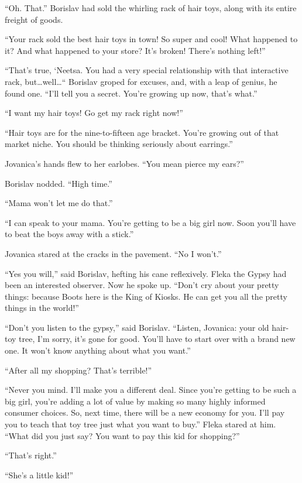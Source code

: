 \documentclass[20 pt,twoside,extrafontsizes,final]{memoir}
\begin{document}
``Oh. That.'' Borislav had sold the whirling rack of hair toys, along with its entire freight of goods. 

``Your rack sold the best hair toys in town! So super and cool! What happened to it? And what happened to your store? It's broken! There's nothing left!''

``That's true, `Neetsa. You had a very special relationship with that interactive rack, but\dots well\dots`` Borislav groped for excuses, and, with a leap of genius, he found one. ``I'll tell you a secret. You're growing up now, that's what.''

``I want my hair toys! Go get my rack right now!''

``Hair toys are for the nine-to-fifteen age bracket. You're growing out of that market niche. You should be thinking seriously about earrings.''

Jovanica's hands flew to her earlobes. ``You mean pierce my ears?''

Borislav nodded. ``High time.''

``Mama won't let me do that.''

``I can speak to your mama. You're getting to be a big girl now. Soon you'll have to beat the boys away with a stick.''

Jovanica stared at the cracks in the pavement. ``No I won't.''

``Yes you will,'' said Borislav, hefting his cane reflexively. Fleka the Gypsy had been an interested observer. Now he spoke up. ``Don't cry about your pretty things: because Boots here is the King of Kiosks. He can get you all the pretty things in the world!''

``Don't you listen to the gypsy,'' said Borislav. ``Listen, Jovanica: your old hair-toy tree, I'm sorry, it's gone for good. You'll have to start over with a brand new one. It won't know anything about what you want.''

``After all my shopping? That's terrible!''

``Never you mind. I'll make you a different deal. Since you're getting to be such a big girl, you're adding a lot of value by making so many highly informed consumer choices. So, next time, there will be a new economy for you. I'll pay you to teach that toy tree just what you want to buy.''
Fleka stared at him. ``What did you just say? You want to pay this kid for shopping?''

``That's right.''

``She's a little kid!''
\end{document}
